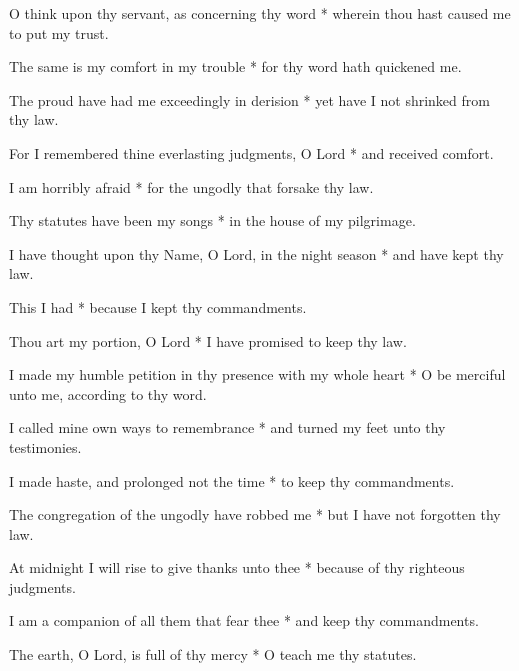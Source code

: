 O think upon thy servant, as concerning thy word * wherein thou hast caused me to put my trust.

The same is my comfort in my trouble * for thy word hath quickened me.

The proud have had me exceedingly in derision * yet have I not shrinked from thy law.

For I remembered thine everlasting judgments, O Lord * and received comfort.

I am horribly afraid * for the ungodly that forsake thy law.

Thy statutes have been my songs * in the house of my pilgrimage.

I have thought upon thy Name, O Lord, in the night season * and have kept thy law.

This I had * because I kept thy commandments.

Thou art my portion, O Lord * I have promised to keep thy law.

I made my humble petition in thy presence with my whole heart * O be merciful unto me, according to thy word.

I called mine own ways to remembrance * and turned my feet unto thy testimonies.

I made haste, and prolonged not the time * to keep thy commandments.

The congregation of the ungodly have robbed me * but I have not forgotten thy law.

At midnight I will rise to give thanks unto thee * because of thy righteous judgments.

I am a companion of all them that fear thee * and keep thy commandments.

The earth, O Lord, is full of thy mercy * O teach me thy statutes.